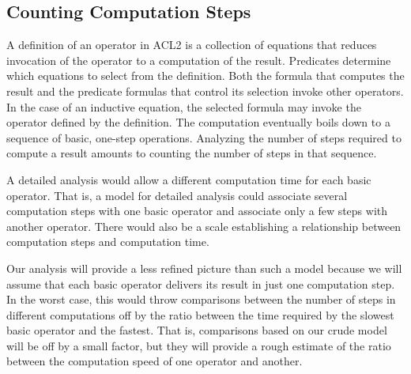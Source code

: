 \subsection{Counting Computation Steps}
\label{subsec:counting-computation-steps}

A definition of an operator in ACL2
is a collection of equations that
reduces invocation of the operator
to a computation of the result.
Predicates determine
which equations to select from the definition.
Both the formula that computes the result and
the predicate formulas that control
its selection invoke other operators.
In the case of an inductive equation,
the selected formula may invoke the operator
defined by the definition.
The computation eventually boils down to a sequence of basic,
one-step operations.
Analyzing the number of steps required to compute a result
amounts to counting the number of steps in that sequence.

A detailed analysis would allow a different
computation time for each basic operator.
That is, a model for detailed analysis could associate
several computation steps with one basic operator
and associate only a few steps with another operator.
There would also be a scale establishing a relationship between
computation steps and computation time.

Our analysis will provide a less refined picture than such
a model because we will assume that each basic operator
delivers its result in just one computation step.
In the worst case, this would throw comparisons between
the number of steps in different computations off
by the ratio between the time required by the slowest basic
operator and the fastest. That is, comparisons
based on our crude model
will be off by a small factor,
but they will provide a
rough estimate of the ratio between the computation speed of
one operator and another.

